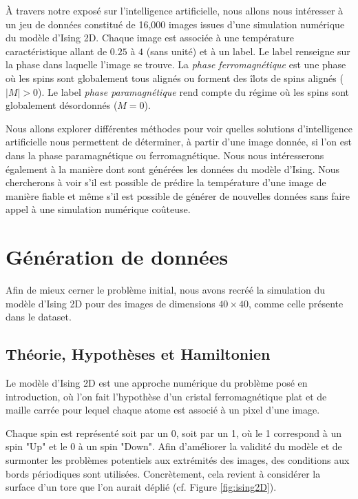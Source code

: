 \documentclass[11pt, parskip=half]{scrartcl} %
\begin{document}
À travers notre exposé sur l'intelligence artificielle, nous allons nous intéresser à un jeu de données constitué de 16,000 images issues d'une simulation numérique du modèle d'Ising 2D. Chaque image est associée à une température caractéristique allant de $0.25$ à $4$ (sans unité) et à un label. Le label renseigne sur la phase dans laquelle l'image se trouve. La \textit{phase ferromagnétique} est une phase où les spins sont globalement tous alignés ou forment des îlots de spins alignés ($|M| > 0$). Le label \textit{phase paramagnétique} rend compte du régime où les spins sont globalement désordonnés ($M = 0$).

Nous allons explorer différentes méthodes pour voir quelles solutions d'intelligence artificielle nous permettent de déterminer, à partir d'une image donnée, si l'on est dans la phase paramagnétique ou ferromagnétique. Nous nous intéresserons également à la manière dont sont générées les données du modèle d'Ising. Nous chercherons à voir s'il est possible de prédire la température d'une image de manière fiable et même s'il est possible de générer de nouvelles données sans faire appel à une simulation numérique coûteuse.

\section{Génération de données}

Afin de mieux cerner le problème initial, nous avons recréé la simulation du modèle d'Ising 2D pour des images de dimensions $40 \times 40$, comme celle présente dans le dataset. 

\subsection{Théorie, Hypothèses et Hamiltonien}
Le modèle d'Ising 2D est une approche numérique du problème posé en introduction, où l'on fait l'hypothèse d'un cristal ferromagnétique plat et de maille carrée pour lequel chaque atome est associé à un pixel d'une image.

Chaque spin est représenté soit par un 0, soit par un 1, où le 1 correspond à un spin "Up" et le 0 à un spin "Down". Afin d'améliorer la validité du modèle et de surmonter les problèmes potentiels aux extrémités des images, des conditions aux bords périodiques sont utilisées. Concrètement, cela revient à considérer la surface d'un tore que l'on aurait déplié (cf. Figure \ref{fig:ising2D}).
\end{document}
